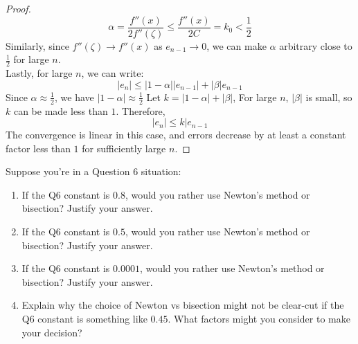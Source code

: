 \documentclass{article}
\begin{document}
\begin{proof}
    \[ \alpha = \frac{f''(x)}{2f''(\zeta)} \leq \frac{f''(x)}{2C} = k_0 < \frac{1}{2} \]
    Similarly, since $f''(\zeta) \rightarrow f''(x)$ as $e_{n-1} \rightarrow 0$, we can make $\alpha$ arbitrary close to $\frac{1}{2}$ for large $n$.
    \\
    Lastly, for large $n$, we can write:
    \[ |e_n| \leq |1 - \alpha||e_{n-1}| + |\beta|e_{n-1} \]
    Since $\alpha \approx \frac{1}{2}$, we have $|1 - \alpha| \approx \frac{1}{2}$
    Let $k = |1 - \alpha| + |\beta|$, For large $n$, $|\beta|$ is small, so $k$ can be made less than $1$.
    Therefore,
    \[ |e_n| \leq k|e_{n-1} \]
    The convergence is linear in this case, and errors decrease by at least a constant factor less than $1$ for sufficiently large $n$.
\end{proof}

\begin{problem}
    Suppose you're in a Question 6 situation:
    \begin{enumerate}
        \item If the Q6 constant is \(0.8\), would you rather use Newton's method or bisection? Justify your answer.
        \item If the Q6 constant is \(0.5\), would you rather use Newton's method or bisection? Justify your answer.
        \item If the Q6 constant is \(0.0001\), would you rather use Newton's method or bisection? Justify your answer.
        \item Explain why the choice of Newton vs bisection might not be clear-cut if the Q6 constant is something like \(0.45\). What factors might you consider to make your decision?
    \end{enumerate}
\end{problem}
\end{document}
